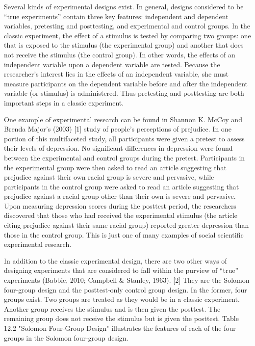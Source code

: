Several kinds of experimental designs exist. In general, designs considered to be “true experiments” contain three key features: independent and dependent variables, pretesting and posttesting, and experimental and control groups. In the classic experiment, the effect of a stimulus is tested by comparing two groups: one that is exposed to the stimulus (the experimental group) and another that does not receive the stimulus (the control group). In other words, the effects of an independent variable upon a dependent variable are tested. Because the researcher’s interest lies in the effects of an independent variable, she must measure participants on the dependent variable before and after the independent variable (or stimulus) is administered. Thus pretesting and posttesting are both important steps in a classic experiment.

One example of experimental research can be found in Shannon K. McCoy and Brenda Major’s (2003) [1] study of people’s perceptions of prejudice. In one portion of this multifaceted study, all participants were given a pretest to assess their levels of depression. No significant differences in depression were found between the experimental and control groups during the pretest. Participants in the experimental group were then asked to read an article suggesting that prejudice against their own racial group is severe and pervasive, while participants in the control group were asked to read an article suggesting that prejudice against a racial group other than their own is severe and pervasive. Upon measuring depression scores during the posttest period, the researchers discovered that those who had received the experimental stimulus (the article citing prejudice against their same racial group) reported greater depression than those in the control group. This is just one of many examples of social scientific experimental research.

In addition to the classic experimental design, there are two other ways of designing experiments that are considered to fall within the purview of “true” experiments (Babbie, 2010; Campbell \& Stanley, 1963). [2] They are the Solomon four-group design and the posttest-only control group design. In the former, four groups exist. Two groups are treated as they would be in a classic experiment. Another group receives the stimulus and is then given the posttest. The remaining group does not receive the stimulus but is given the posttest. Table 12.2 "Solomon Four-Group Design" illustrates the features of each of the four groups in the Solomon four-group design.

